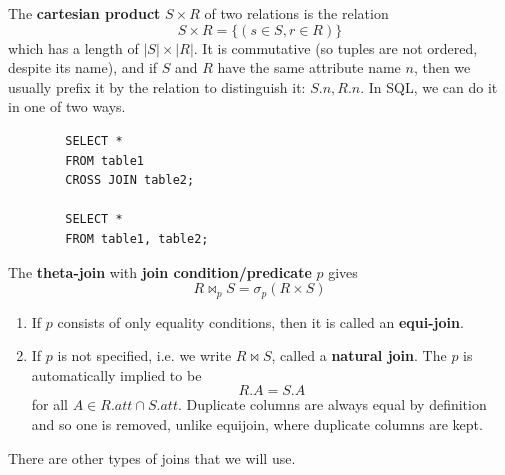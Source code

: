 \documentclass{article}
\begin{document}
    \begin{definition}
      The \textbf{cartesian product} $S \times R$ of two relations is the relation 
      \begin{equation}
        S \times R = \{(s \in S, r \in R)\} 
      \end{equation}
      which has a length of $|S| \times |R|$. It is commutative (so tuples are not ordered, despite its name), and if $S$ and $R$ have the same attribute name $n$, then we usually prefix it by the relation to distinguish it: $S.n, R.n$. In SQL, we can do it in one of two ways. 
      \begin{lstlisting}
        SELECT *
        FROM table1
        CROSS JOIN table2; 

        SELECT *
        FROM table1, table2; 
      \end{lstlisting}
    \end{definition}

    \begin{definition}
      The \textbf{theta-join} with \textbf{join condition/predicate} $p$ gives 
      \begin{equation}
        R \bowtie_p S = \sigma_p (R \times S)
      \end{equation}
      \begin{enumerate}
        \item If $p$ consists of only equality conditions, then it is called an \textbf{equi-join}. 
        \item If $p$ is not specified, i.e. we write $R \bowtie S$, called a \textbf{natural join}. The $p$ is automatically implied to be 
          \begin{equation}
            R.A = S.A
          \end{equation}
          for all $A \in R.att \cap S.att$. Duplicate columns are always equal by definition and so one is removed, unlike equijoin, where duplicate columns are kept. 
      \end{enumerate}
    \end{definition}

    There are other types of joins that we will use. 
\end{document}
